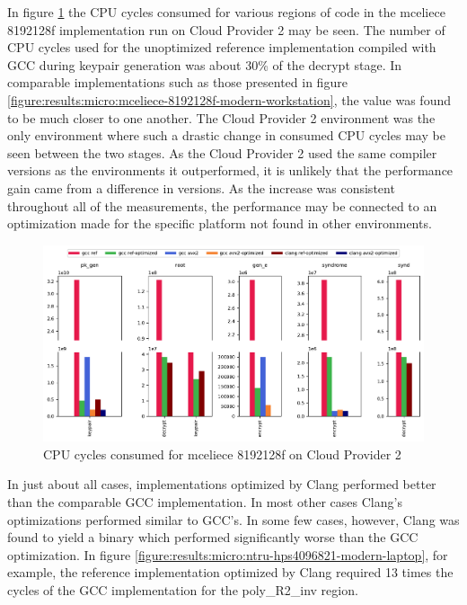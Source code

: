 In figure \ref{figure:results:micro:mceliece-8192128f-cloud-provider-2} the CPU cycles consumed for various regions of code in the \gls{mceliece} 8192128f implementation run on Cloud Provider 2 may be seen. The number of CPU cycles used for the unoptimized reference implementation compiled with GCC during keypair generation was about 30\% of the decrypt stage. In comparable implementations such as those presented in figure \ref{figure:results:micro:mceliece-8192128f-modern-workstation}, the value was found to be much closer to one another. The Cloud Provider 2 environment was the only environment where such a drastic change in consumed CPU cycles may be seen between the two stages. As the Cloud Provider 2 used the same compiler versions as the environments it outperformed, it is unlikely that the performance gain came from a difference in versions. As the increase was consistent throughout all of the measurements, the performance may be connected to an optimization made for the specific platform not found in other environments.

\begin{figure}
    \centering
    \includegraphics[width=\textwidth]{chapters/results/micro/mceliece_8192128f_Cloud Provider 2_cpu-cycles.pdf}
    \caption{CPU cycles consumed for \gls{mceliece} 8192128f on Cloud Provider 2}
    \label{figure:results:micro:mceliece-8192128f-cloud-provider-2}
\end{figure}

In just about all cases, implementations optimized by Clang performed better than the comparable GCC implementation. In most other cases Clang's optimizations performed similar to GCC's. In some few cases, however, Clang was found to yield a binary which performed significantly worse than the GCC optimization. In figure \ref{figure:results:micro:ntru-hps4096821-modern-laptop}, for example, the reference implementation optimized by Clang required 13 times the cycles of the GCC implementation for the poly\_R2\_inv region.

